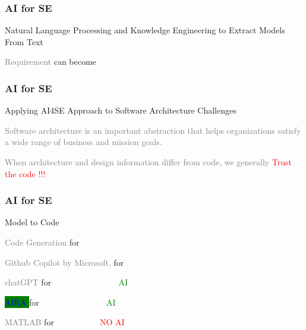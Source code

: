 \newpage
\begin{frame}
\frametitle{ AI for SE }
\begin{block}{Natural Language Processing and Knowledge Engineering to Extract Models From Text }

 


  \vspace{1cm} 

 \colorbox{gray!35}{ \textcolor{gray}{ Requirement } }   can become
   \colorbox{blue!47}{ \textcolor{white}{  Model by using NLP } }


\end{block}
\end{frame}



\newpage
\begin{frame}
\frametitle{ AI for SE }
\begin{block}{ Applying AI4SE Approach to Software Architecture Challenges }

  \vspace{1cm} 
  
 \textcolor{gray}{ 
Software architecture is an important abstraction
that helps organizations satisfy a wide range of
business and mission goals.}

  \vspace{1cm} 

 \textcolor{gray}{ When architecture and design information differ
from code, we generally
}  \textcolor{red}{ Trust the code !!!}

\end{block}
\end{frame}




\newpage
\begin{frame}
\frametitle{ AI for SE }
\begin{block}{Model to Code }

 


  \vspace{1cm} 

 \colorbox{gray!35}{ \textcolor{gray}{ Code Generation  } }   for
   \colorbox{blue!47}{ \textcolor{white}{  Target Device } }

  \vspace{1cm} 
  
  

 
   
 \colorbox{gray!35}{ \textcolor{gray}{ Github Copilot by Microsoft, } }   for
   \colorbox{blue!47}{ \textcolor{white}{  “AI pair programmer”  } }

    \colorbox{gray!35}{ \textcolor{gray}{   chatGPT } }   for
   \colorbox{blue!47}{ \textcolor{white}{  Code Generation  } } \textcolor{green}{ AI }
   

\colorbox{green}{ \textcolor{blue}{   AIRA } }   for
   \colorbox{blue!47}{ \textcolor{white}{  Code Generation  } } \textcolor{green}{ AI }

       \colorbox{gray!35}{ \textcolor{gray}{   MATLAB } }   for
   \colorbox{blue!47}{ \textcolor{white}{  HDL coder } } \textcolor{red}{ NO AI }
   
\end{block}
\end{frame}


